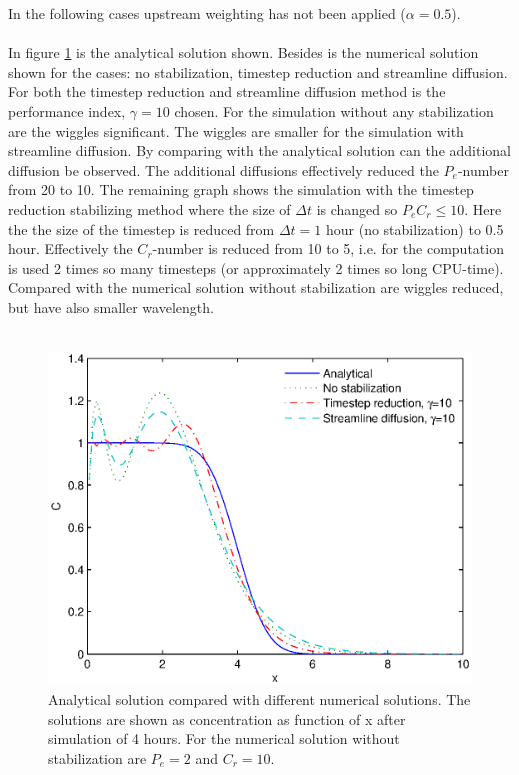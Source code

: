 \documentclass{report}
\begin{document}
In the following cases upstream weighting has not been applied
($\alpha=0.5$).\\
\\
In figure \ref{fig:Stab_Methods} is the analytical solution shown.
Besides is the numerical solution shown for the cases: no
stabilization, timestep reduction and streamline diffusion. For both
the timestep reduction and streamline diffusion method is the
performance index, $\gamma=10$ chosen. For the simulation
without any stabilization are the wiggles significant. The wiggles are
smaller for the simulation with streamline diffusion. By comparing
with the analytical solution can the additional diffusion be observed.
The additional diffusions effectively reduced the $P_e$-number from
20 to 10. The remaining graph shows the simulation with the
timestep reduction stabilizing method where the size of $\Delta t$ is
changed so $P_eC_r\leq10$. Here the the size of the timestep is
reduced from $\Delta t=1$ hour (no stabilization) to 0.5 hour.
Effectively the $C_r$-number is reduced from 10 to 5, i.e. for the
computation is used 2 times so many timesteps (or approximately
2 times so long CPU-time). Compared with the numerical solution
without stabilization are wiggles reduced, but have also smaller
wavelength.\\
\\

\begin{figure}[htbp]  %
\includegraphics[width=\hsize]{Stab_Methods.eps}
\caption{Analytical solution compared with different numerical solutions. The
solutions are shown as concentration as function of x after
simulation of 4 hours. For the numerical solution without
stabilization are $P_e=2$ and $C_r=10$.}
 \label{fig:Stab_Methods}
\end{figure}
\end{document}
